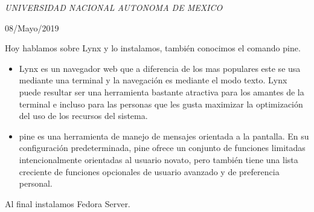 \documentclass[a4paper, 11pt, oneside]{article}
\begin{document}
\begin{titlepage}
	\textit{UNIVERSIDAD NACIONAL AUTONOMA DE MEXICO} 
	
	\vfill
	
	
	
	
	\vspace{0.3\baselineskip} 
	
	08/Mayo/2019 
	
	

\end{titlepage}
Hoy hablamos sobre Lynx y lo instalamos, también conocimos el comando pine. 
\begin{itemize}
    \item Lynx es un navegador web que a diferencia de los mas populares este se usa mediante una terminal y la navegación es mediante el modo texto. Lynx puede resultar ser una herramienta bastante atractiva para los amantes de la terminal e incluso para las personas que les gusta maximizar la optimización del uso de los recursos del sistema.
    \item pine es una herramienta de manejo de mensajes orientada a la pantalla. En su configuración predeterminada, pine ofrece un conjunto de funciones limitadas intencionalmente orientadas al usuario novato, pero también tiene una lista creciente de funciones opcionales de usuario avanzado y de preferencia personal.
\end{itemize}
Al final instalamos Fedora Server.
\end{document}

